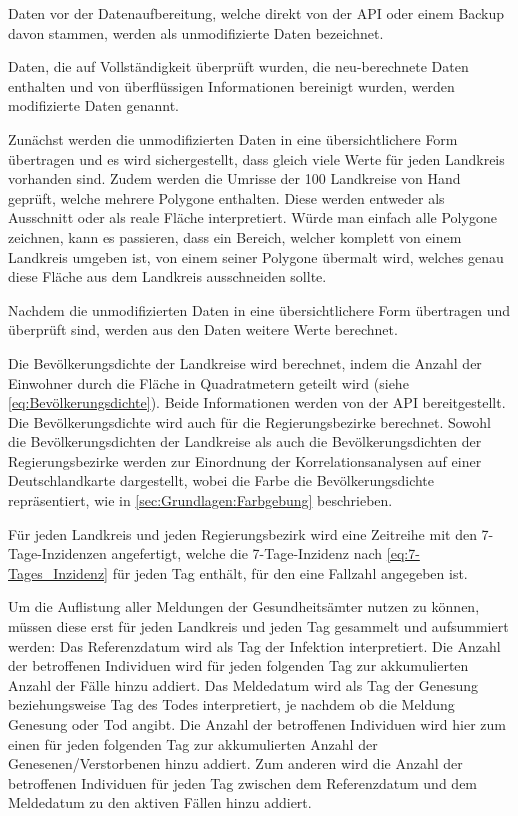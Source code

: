 Daten vor der Datenaufbereitung, welche direkt von der API oder einem Backup davon stammen, werden als \glqq{}unmodifizierte Daten\grqq{} bezeichnet. 

Daten, die auf Vollständigkeit überprüft wurden, die neu-berechnete Daten enthalten und von überflüssigen Informationen bereinigt wurden, werden \glqq{}modifizierte Daten\grqq{} genannt.

Zunächst werden die unmodifizierten Daten in eine übersichtlichere Form übertragen und es wird sichergestellt, dass gleich viele Werte für jeden Landkreis vorhanden sind. Zudem werden die Umrisse der 100 Landkreise von Hand geprüft, welche mehrere Polygone enthalten. Diese werden entweder als Ausschnitt oder als reale Fläche interpretiert. Würde man einfach alle Polygone zeichnen, kann es passieren, dass ein Bereich, welcher komplett von einem Landkreis umgeben ist, von einem seiner Polygone übermalt wird, welches genau diese Fläche aus dem Landkreis ausschneiden sollte.

Nachdem die unmodifizierten Daten in eine übersichtlichere Form übertragen und überprüft sind, werden aus den Daten weitere Werte berechnet.

Die Bevölkerungsdichte der Landkreise wird berechnet, indem die Anzahl der Einwohner durch die Fläche in Quadratmetern geteilt wird (siehe \autoref{eq:Bevölkerungsdichte}). Beide Informationen werden von der API bereitgestellt.
Die Bevölkerungsdichte wird auch für die Regierungsbezirke berechnet. 
Sowohl die Bevölkerungsdichten der Landkreise als auch die Bevölkerungsdichten der Regierungsbezirke werden zur Einordnung der Korrelationsanalysen auf einer Deutschlandkarte dargestellt, wobei die Farbe die Bevölkerungsdichte repräsentiert, wie in \autoref{sec:Grundlagen:Farbgebung} beschrieben.

Für jeden Landkreis und jeden Regierungsbezirk wird eine Zeitreihe mit den 7-Tage-Inzidenzen angefertigt, welche die 7-Tage-Inzidenz nach \autoref{eq:7-Tages_Inzidenz} für jeden Tag enthält, für den eine Fallzahl angegeben ist. 

Um die Auflistung aller Meldungen der Gesundheitsämter nutzen zu können, müssen diese erst für jeden Landkreis und jeden Tag gesammelt und aufsummiert werden:
Das Referenzdatum wird als Tag der Infektion interpretiert. Die Anzahl der betroffenen Individuen wird für jeden folgenden Tag zur akkumulierten Anzahl der Fälle hinzu addiert.
Das Meldedatum wird als Tag der Genesung beziehungsweise Tag des Todes interpretiert, je nachdem ob die Meldung Genesung oder Tod angibt. Die Anzahl der betroffenen Individuen wird hier zum einen für jeden folgenden Tag zur akkumulierten Anzahl der Genesenen/Verstorbenen hinzu addiert. Zum anderen wird die Anzahl der betroffenen Individuen für jeden Tag zwischen dem Referenzdatum und dem Meldedatum zu den aktiven Fällen hinzu addiert.

